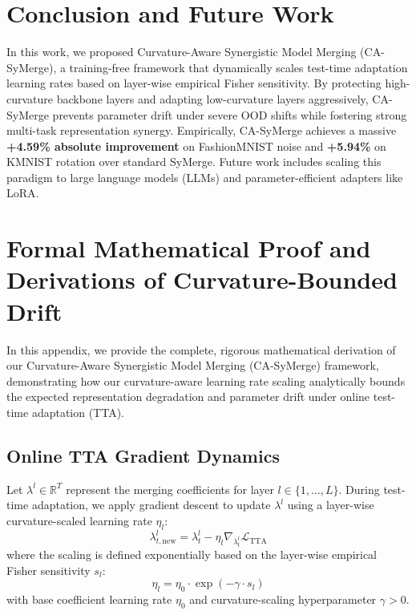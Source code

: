 \documentclass{article}
\begin{document}
\section{Conclusion and Future Work}
\label{sec:conclusion}
In this work, we proposed Curvature-Aware Synergistic Model Merging (CA-SyMerge), a training-free framework that dynamically scales test-time adaptation learning rates based on layer-wise empirical Fisher sensitivity. By protecting high-curvature backbone layers and adapting low-curvature layers aggressively, CA-SyMerge prevents parameter drift under severe OOD shifts while fostering strong multi-task representation synergy. Empirically, CA-SyMerge achieves a massive \textbf{+4.59\% absolute improvement} on FashionMNIST noise and \textbf{+5.94\%} on KMNIST rotation over standard SyMerge. Future work includes scaling this paradigm to large language models (LLMs) and parameter-efficient adapters like LoRA.

\clearpage



\newpage
\appendix
\onecolumn

\section{Formal Mathematical Proof and Derivations of Curvature-Bounded Drift}
\label{app:proof}
In this appendix, we provide the complete, rigorous mathematical derivation of our Curvature-Aware Synergistic Model Merging (CA-SyMerge) framework, demonstrating how our curvature-aware learning rate scaling analytically bounds the expected representation degradation and parameter drift under online test-time adaptation (TTA).

\subsection{Online TTA Gradient Dynamics}
Let $\lambda^l \in \mathbb{R}^T$ represent the merging coefficients for layer $l \in \{1, \dots, L\}$. During test-time adaptation, we apply gradient descent to update $\lambda^l$ using a layer-wise curvature-scaled learning rate $\eta_l$:
\begin{equation}
    \lambda^l_{t, \text{new}} = \lambda^l_{t} - \eta_l \nabla_{\lambda^l_t} \mathcal{L}_{\text{TTA}}
\end{equation}
where the scaling is defined exponentially based on the layer-wise empirical Fisher sensitivity $s_l$:
\begin{equation}
    \eta_l = \eta_0 \cdot \exp(-\gamma \cdot s_l)
\end{equation}
with base coefficient learning rate $\eta_0$ and curvature-scaling hyperparameter $\gamma > 0$.
\end{document}

